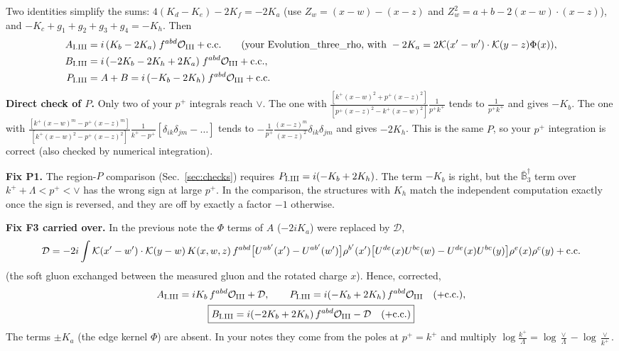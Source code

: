 \documentclass[10pt]{article}
\numberwithin{equation}{section}
\newcommand{\KK}{\mathcal K}
\newcommand{\kp}{k^+}
\newcommand{\pp}{p^+}
\begin{document}
Two identities simplify the sums: $4(K_d-K_e)-2K_f=-2K_a$ (use $Z_w=(x-w)-(x-z)$ and $Z_w^2=a+b-2(x-w)\cdot(x-z)$), and $-K_c+g_1+g_2+g_3+g_4=-K_h$. Then
\begin{align}
A_{\rm I.III}&=i\,(K_b-2K_a)\;f^{abd}\mathcal O_{\rm III}+{\rm c.c.}\qquad\text{(your Evolution\_three\_rho, with }-2K_a=2\KK(x'-w')\cdot\KK(y-z)\Phi(x)),\notag\\
B_{\rm I.III}&=i\,(-2K_b-2K_h+2K_a)\;f^{abd}\mathcal O_{\rm III}+{\rm c.c.},\notag\\
P_{\rm I.III}&=A+B=i\,(-K_b-2K_h)\;f^{abd}\mathcal O_{\rm III}+{\rm c.c.}
\end{align}
\textbf{Direct check of $P$.} Only two of your $\pp$ integrals reach $\vee$. The one with $\frac{[k^+(x-w)^2+\pp(x-z)^2]}{[\pp(x-z)^2-k^+(x-w)^2]}\frac{1}{\pp k^+}$ tends to $\frac{1}{\pp k^+}$ and gives $-K_b$. The one with $\frac{[k^+(x-w)^m-\pp(x-z)^m]}{[k^+(x-w)^2-\pp(x-z)^2]}\frac{1}{k^+-\pp}[\delta_{ik}\delta_{jm}-\dots]$ tends to $-\frac{1}{\pp}\frac{(x-z)^m}{(x-z)^2}\delta_{ik}\delta_{jm}$ and gives $-2K_h$. This is the same $P$, so your $\pp$ integration is correct (also checked by numerical integration).

\textbf{Fix P1.} The region-$P$ comparison (Sec.~\ref{sec:checks}) requires $P_{\rm I.III}=i(-K_b+2K_h)$. The term $-K_b$ is right, but the $\bar{\mathbb B}_3^\dagger$ term over $\kp+\Lambda<\pp<\vee$ has the wrong sign at large $\pp$. In the comparison, the structures with $K_h$ match the independent computation exactly once the sign is reversed, and they are off by exactly a factor $-1$ otherwise.

\textbf{Fix F3 carried over.} In the previous note the $\Phi$ terms of $A$ ($-2iK_a$) were replaced by $\mathcal D$,
\[
\mathcal D=-2i\int\KK(x'-w')\cdot\KK(y-w)\,K(x,w,z)\,f^{abd}\big[U^{ab'}(x')-U^{ab'}(w')\big]\rho^{b'}(x')\big[U^{de}(x)U^{bc}(w)-U^{de}(x)U^{bc}(y)\big]\rho^e(x)\rho^c(y)+{\rm c.c.}
\]
(the soft gluon exchanged between the measured gluon and the rotated charge $x$). Hence, corrected,
\begin{gather}
A_{\rm I.III}=iK_b\,f^{abd}\mathcal O_{\rm III}+\mathcal D,\qquad P_{\rm I.III}=i(-K_b+2K_h)\,f^{abd}\mathcal O_{\rm III}\quad(+{\rm c.c.}),\notag\\
\boxed{B_{\rm I.III}=i(-2K_b+2K_h)\,f^{abd}\mathcal O_{\rm III}-\mathcal D\quad(+{\rm c.c.})}
\end{gather}
The terms $\pm K_a$ (the edge kernel $\Phi$) are absent. In your notes they come from the poles at $\pp=\kp$ and multiply $\log\frac{k^+}{\Lambda}=\log\frac{\vee}{\Lambda}-\log\frac{\vee}{k^+}$.
\end{document}
